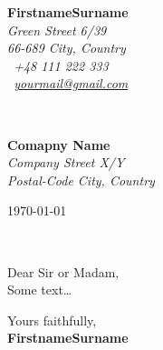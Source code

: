 \documentclass[11pt]{article}
\def\firstname{Firstname}
\def\familyname{Surname}
\def\FileAuthor{\firstname\space\familyname}
\begin{document}
\hfill%
\begin{minipage}[t]{.6\textwidth}
\raggedleft%
{\bfseries \FileAuthor}\\[.35ex]
\small\itshape%
Green Street 6/39\\
66-689 City, Country\\[.35ex]
\Mobilefone~+48 111 222 333\\
\Letter~\href{mailto:yourmail@gmail.com}{yourmail@gmail.com}
\end{minipage}\\[1em]
%
\begin{minipage}[t]{.4\textwidth}
\raggedright%
{\bfseries Comapny Name}\\[.35ex]
\small\itshape%
Company Street X/Y\\
Postal-Code City, Country
\end{minipage}
\hfill %
\begin{minipage}[t]{.4\textwidth}
\raggedleft %
\today
\end{minipage}\\[2em]
\raggedright
Dear Sir or Madam,\\[1.5em]
%
Some text\dots

Yours faithfully,\\[2em] %
%
{\bfseries \FileAuthor}\\
%
\end{document}
